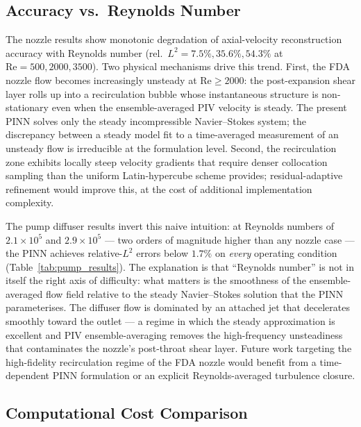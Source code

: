 \documentclass[12pt,a4paper]{article}
\newcommand{\Reyn}{\mathrm{Re}}    %
\begin{document}
\subsection{Accuracy vs.\ Reynolds Number}
\label{sec:discuss_re}

The nozzle results show monotonic degradation of axial-velocity
reconstruction accuracy with Reynolds number
(rel.~$L^2 = 7.5\%, 35.6\%, 54.3\%$ at $\Reyn = 500, 2000, 3500$).
Two physical mechanisms drive this trend. First, the FDA nozzle
flow becomes increasingly unsteady at $\Reyn \geq 2000$: the
post-expansion shear layer rolls up into a recirculation bubble
whose instantaneous structure is non-stationary even when the
ensemble-averaged PIV velocity is steady. The present PINN
solves only the steady incompressible Navier--Stokes system; the
discrepancy between a steady model fit to a time-averaged
measurement of an unsteady flow is irreducible at the
formulation level. Second, the recirculation zone exhibits
locally steep velocity gradients that require denser collocation
sampling than the uniform Latin-hypercube scheme provides;
residual-adaptive refinement \cite{Wu2023RAR} would improve this,
at the cost of additional implementation complexity.

The pump diffuser results invert this naive intuition: at
Reynolds numbers of $2.1 \times 10^5$ and $2.9 \times 10^5$ ---
two orders of magnitude higher than any nozzle case --- the PINN
achieves relative-$L^2$ errors below $1.7\%$ on \emph{every}
operating condition (Table~\ref{tab:pump_results}). The
explanation is that ``Reynolds number'' is not in itself the
right axis of difficulty: what matters is the smoothness of the
ensemble-averaged flow field relative to the steady
Navier--Stokes solution that the PINN parameterises. The
diffuser flow is dominated by an attached jet that decelerates
smoothly toward the outlet --- a regime in which the steady
approximation is excellent and PIV ensemble-averaging removes
the high-frequency unsteadiness that contaminates the nozzle's
post-throat shear layer. Future work targeting the
high-fidelity recirculation regime of the FDA nozzle would
benefit from a time-dependent PINN formulation
\cite{Raissi2020HFM} or an explicit Reynolds-averaged turbulence
closure.

\subsection{Computational Cost Comparison}
\label{sec:discuss_cost}
\end{document}
